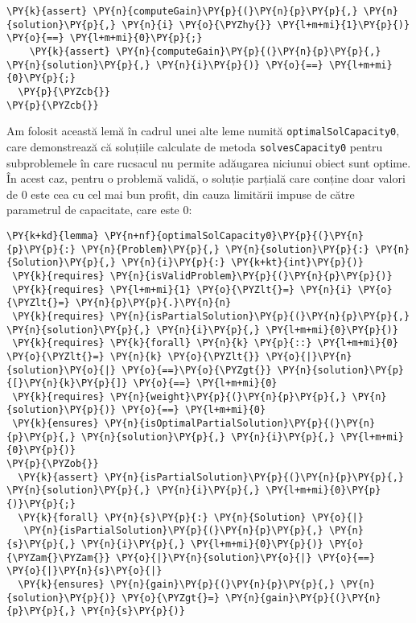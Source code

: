 \begin{sloppypar}
\begin{Verbatim}[commandchars=\\\{\}]
    \PY{k}{assert} \PY{n}{computeGain}\PY{p}{(}\PY{n}{p}\PY{p}{,} \PY{n}{solution}\PY{p}{,} \PY{n}{i} \PY{o}{\PYZhy{}} \PY{l+m+mi}{1}\PY{p}{)} \PY{o}{==} \PY{l+m+mi}{0}\PY{p}{;}
    \PY{k}{assert} \PY{n}{computeGain}\PY{p}{(}\PY{n}{p}\PY{p}{,} \PY{n}{solution}\PY{p}{,} \PY{n}{i}\PY{p}{)} \PY{o}{==} \PY{l+m+mi}{0}\PY{p}{;}
  \PY{p}{\PYZcb{}}
\PY{p}{\PYZcb{}}
\end{Verbatim}
\hspace{4mm} Am folosit această lemă în cadrul unei alte leme numită \texttt{optimalSolCapacity0}, care demonstrează că soluțiile calculate de metoda \texttt{solvesCapacity0} pentru subproblemele în care rucsacul nu permite adăugarea niciunui obiect sunt optime. În acest caz, pentru o problemă validă, o soluție parțială care conține doar valori de 0 este cea cu cel mai bun profit, din cauza limitării impuse de către parametrul de capacitate, care este 0:
\begin{Verbatim}[commandchars=\\\{\}]
\PY{k+kd}{lemma} \PY{n+nf}{optimalSolCapacity0}\PY{p}{(}\PY{n}{p}\PY{p}{:} \PY{n}{Problem}\PY{p}{,} \PY{n}{solution}\PY{p}{:} \PY{n}{Solution}\PY{p}{,} \PY{n}{i}\PY{p}{:} \PY{k+kt}{int}\PY{p}{)}
 \PY{k}{requires} \PY{n}{isValidProblem}\PY{p}{(}\PY{n}{p}\PY{p}{)}
 \PY{k}{requires} \PY{l+m+mi}{1} \PY{o}{\PYZlt{}=} \PY{n}{i} \PY{o}{\PYZlt{}=} \PY{n}{p}\PY{p}{.}\PY{n}{n}
 \PY{k}{requires} \PY{n}{isPartialSolution}\PY{p}{(}\PY{n}{p}\PY{p}{,} \PY{n}{solution}\PY{p}{,} \PY{n}{i}\PY{p}{,} \PY{l+m+mi}{0}\PY{p}{)}
 \PY{k}{requires} \PY{k}{forall} \PY{n}{k} \PY{p}{::} \PY{l+m+mi}{0} \PY{o}{\PYZlt{}=} \PY{n}{k} \PY{o}{\PYZlt{}} \PY{o}{|}\PY{n}{solution}\PY{o}{|} \PY{o}{==}\PY{o}{\PYZgt{}} \PY{n}{solution}\PY{p}{[}\PY{n}{k}\PY{p}{]} \PY{o}{==} \PY{l+m+mi}{0}
 \PY{k}{requires} \PY{n}{weight}\PY{p}{(}\PY{n}{p}\PY{p}{,} \PY{n}{solution}\PY{p}{)} \PY{o}{==} \PY{l+m+mi}{0}
 \PY{k}{ensures} \PY{n}{isOptimalPartialSolution}\PY{p}{(}\PY{n}{p}\PY{p}{,} \PY{n}{solution}\PY{p}{,} \PY{n}{i}\PY{p}{,} \PY{l+m+mi}{0}\PY{p}{)}
\PY{p}{\PYZob{}}
  \PY{k}{assert} \PY{n}{isPartialSolution}\PY{p}{(}\PY{n}{p}\PY{p}{,} \PY{n}{solution}\PY{p}{,} \PY{n}{i}\PY{p}{,} \PY{l+m+mi}{0}\PY{p}{)}\PY{p}{;}
  \PY{k}{forall} \PY{n}{s}\PY{p}{:} \PY{n}{Solution} \PY{o}{|} 
   \PY{n}{isPartialSolution}\PY{p}{(}\PY{n}{p}\PY{p}{,} \PY{n}{s}\PY{p}{,} \PY{n}{i}\PY{p}{,} \PY{l+m+mi}{0}\PY{p}{)} \PY{o}{\PYZam{}\PYZam{}} \PY{o}{|}\PY{n}{solution}\PY{o}{|} \PY{o}{==} \PY{o}{|}\PY{n}{s}\PY{o}{|}
  \PY{k}{ensures} \PY{n}{gain}\PY{p}{(}\PY{n}{p}\PY{p}{,} \PY{n}{solution}\PY{p}{)} \PY{o}{\PYZgt{}=} \PY{n}{gain}\PY{p}{(}\PY{n}{p}\PY{p}{,} \PY{n}{s}\PY{p}{)}

\end{Verbatim}
\end{sloppypar}
